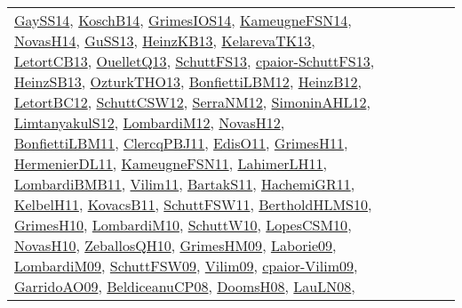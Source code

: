 {\begin{longtable}{llp{6cm}p{6cm}p{6cm}}
\href{papers/GaySS14.pdf}{GaySS14}\cite{GaySS14}, \href{papers/KoschB14.pdf}{KoschB14}\cite{KoschB14}, \href{articles/GrimesIOS14.pdf}{GrimesIOS14}\cite{GrimesIOS14}, \href{articles/KameugneFSN14.pdf}{KameugneFSN14}\cite{KameugneFSN14}, \href{articles/NovasH14.pdf}{NovasH14}\cite{NovasH14}, \href{papers/GuSS13.pdf}{GuSS13}\cite{GuSS13}, \href{papers/HeinzKB13.pdf}{HeinzKB13}\cite{HeinzKB13}, \href{papers/KelarevaTK13.pdf}{KelarevaTK13}\cite{KelarevaTK13}, \href{papers/LetortCB13.pdf}{LetortCB13}\cite{LetortCB13}, \href{papers/OuelletQ13.pdf}{OuelletQ13}\cite{OuelletQ13}, \href{papers/SchuttFS13.pdf}{SchuttFS13}\cite{SchuttFS13}, \href{papers/cpaior-SchuttFS13.pdf}{cpaior-SchuttFS13}\cite{cpaior-SchuttFS13}, \href{articles/HeinzSB13.pdf}{HeinzSB13}\cite{HeinzSB13}, \href{articles/OzturkTHO13.pdf}{OzturkTHO13}\cite{OzturkTHO13}, \href{papers/BonfiettiLBM12.pdf}{BonfiettiLBM12}\cite{BonfiettiLBM12}, \href{papers/HeinzB12.pdf}{HeinzB12}\cite{HeinzB12}, \href{papers/LetortBC12.pdf}{LetortBC12}\cite{LetortBC12}, \href{papers/SchuttCSW12.pdf}{SchuttCSW12}\cite{SchuttCSW12}, \href{papers/SerraNM12.pdf}{SerraNM12}\cite{SerraNM12}, \href{papers/SimoninAHL12.pdf}{SimoninAHL12}\cite{SimoninAHL12}, \href{articles/LimtanyakulS12.pdf}{LimtanyakulS12}\cite{LimtanyakulS12}, \href{articles/LombardiM12.pdf}{LombardiM12}\cite{LombardiM12}, \href{articles/NovasH12.pdf}{NovasH12}\cite{NovasH12}, \href{papers/BonfiettiLBM11.pdf}{BonfiettiLBM11}\cite{BonfiettiLBM11}, \href{papers/ClercqPBJ11.pdf}{ClercqPBJ11}\cite{ClercqPBJ11}, \href{papers/EdisO11.pdf}{EdisO11}\cite{EdisO11}, \href{papers/GrimesH11.pdf}{GrimesH11}\cite{GrimesH11}, \href{papers/HermenierDL11.pdf}{HermenierDL11}\cite{HermenierDL11}, \href{papers/KameugneFSN11.pdf}{KameugneFSN11}\cite{KameugneFSN11}, \href{papers/LahimerLH11.pdf}{LahimerLH11}\cite{LahimerLH11}, \href{papers/LombardiBMB11.pdf}{LombardiBMB11}\cite{LombardiBMB11}, \href{papers/Vilim11.pdf}{Vilim11}\cite{Vilim11}, \href{articles/BartakS11.pdf}{BartakS11}\cite{BartakS11}, \href{articles/HachemiGR11.pdf}{HachemiGR11}\cite{HachemiGR11}, \href{articles/KelbelH11.pdf}{KelbelH11}\cite{KelbelH11}, \href{articles/KovacsB11.pdf}{KovacsB11}\cite{KovacsB11}, \href{articles/SchuttFSW11.pdf}{SchuttFSW11}\cite{SchuttFSW11}, \href{papers/BertholdHLMS10.pdf}{BertholdHLMS10}\cite{BertholdHLMS10}, \href{papers/GrimesH10.pdf}{GrimesH10}\cite{GrimesH10}, \href{papers/LombardiM10.pdf}{LombardiM10}\cite{LombardiM10}, \href{papers/SchuttW10.pdf}{SchuttW10}\cite{SchuttW10}, \href{articles/LopesCSM10.pdf}{LopesCSM10}\cite{LopesCSM10}, \href{articles/NovasH10.pdf}{NovasH10}\cite{NovasH10}, \href{articles/ZeballosQH10.pdf}{ZeballosQH10}\cite{ZeballosQH10}, \href{papers/GrimesHM09.pdf}{GrimesHM09}\cite{GrimesHM09}, \href{papers/Laborie09.pdf}{Laborie09}\cite{Laborie09}, \href{papers/LombardiM09.pdf}{LombardiM09}\cite{LombardiM09}, \href{papers/SchuttFSW09.pdf}{SchuttFSW09}\cite{SchuttFSW09}, \href{papers/Vilim09.pdf}{Vilim09}\cite{Vilim09}, \href{papers/cpaior-Vilim09.pdf}{cpaior-Vilim09}\cite{cpaior-Vilim09}, \href{articles/GarridoAO09.pdf}{GarridoAO09}\cite{GarridoAO09}, \href{papers/BeldiceanuCP08.pdf}{BeldiceanuCP08}\cite{BeldiceanuCP08}, \href{papers/DoomsH08.pdf}{DoomsH08}\cite{DoomsH08}, \href{papers/LauLN08.pdf}{LauLN08}\cite{LauLN08}, 
\end{longtable}}
